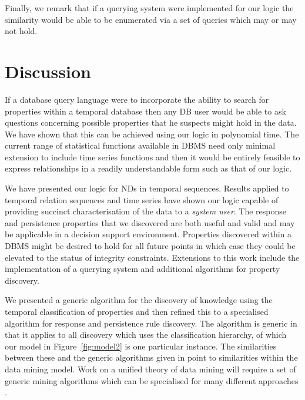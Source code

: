 Finally, we remark that if a querying system were implemented for our
logic the similarity would be able to be enumerated via a set of
queries which may or may not hold.

\section{Discussion}\label{sec:tr_disc}



If a database query language were to incorporate the ability to search
for properties within a temporal database then any DB user would be
able to ask questions concerning possible properties that he suspects
might hold in the data. We have shown that this can be achieved using
our logic in polynomial time. The current range of statistical
functions available in DBMS need only minimal extension to include time
series functions and then it would be entirely feasible to express
relationships in a readily understandable form such as that of our
logic.
 
\medskip
 
We have presented our logic for NDs in temporal sequences. Results
applied to temporal relation sequences and time series have shown our
logic capable of providing succinct characterisation of the data to a
{\em system user}. The response and persistence properties that we
discovered are both useful and 
valid and may be applicable in a decision support
environment. Properties discovered within a DBMS might be
desired to hold for all future points in which case they could be
elevated to the status of integrity constraints. 
Extensions to this work include the implementation of a
querying system and additional algorithms for property discovery.

\medskip
We presented a generic algorithm for the discovery of knowledge using
the temporal classification of properties and then refined this to a
specialised algorithm for response and persistence rule discovery. The
algorithm is generic in that it applies to all discovery which uses
the classification hierarchy, of which our model in
Figure~\ref{fig:model2} is one particular instance.
The similarities between
these and the generic algorithms given in \cite{man96,man97} point to
similarities within the data mining model. Work on a unified theory of
data mining will require a set of generic mining algorithms which can
be specialised for many different approaches \cite{jmw96}.
\medskip 

